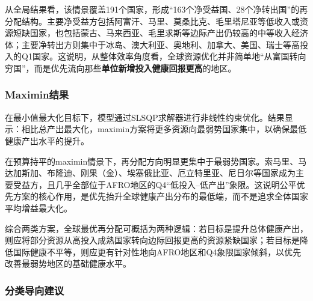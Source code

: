 \documentclass[12pt,a4paper]{ctexart}
\begin{document}


从全局结果看，该情景覆盖191个国家，形成“163个净受益国、28个净转出国”的再分配结构。主要净受益方包括阿富汗、马里、莫桑比克、毛里塔尼亚等低收入或资源短缺国家，也包括蒙古、马来西亚、毛里求斯等边际产出仍较高的中等收入经济体；主要净转出方则集中于冰岛、澳大利亚、奥地利、加拿大、美国、瑞士等高投入的Q1国家。这说明，从整体效率角度看，全球资源优化并非简单地“从富国转向穷国”，而是优先流向那些\textbf{单位新增投入健康回报更高}的地区。

\subsubsection{Maximin结果}

在最小值最大化目标下，模型通过SLSQP求解器进行非线性约束优化。结果显示：相比总产出最大化，maximin方案将更多资源向最弱势国家集中，以确保最低健康产出水平的提升。

在预算持平的maximin情景下，再分配方向明显更集中于最弱势国家。索马里、马达加斯加、布隆迪、刚果（金）、埃塞俄比亚、厄立特里亚、尼日尔等国家成为主要受益方，且几乎全部位于AFRO地区的Q4“低投入--低产出”象限。这说明公平优先方案的核心作用，是优先抬升全球健康产出分布的最低端，而不是追求全体国家平均增益最大化。

综合两类方案，全球最优再分配可概括为两种逻辑：若目标是提升总体健康产出，则应将部分资源从高投入成熟国家转向边际回报更高的资源紧缺国家；若目标是降低国际健康不平等，则应更有针对性地向AFRO地区和Q4象限国家倾斜，以优先改善最弱势地区的基础健康水平。

\subsubsection{分类导向建议}
\end{document}
